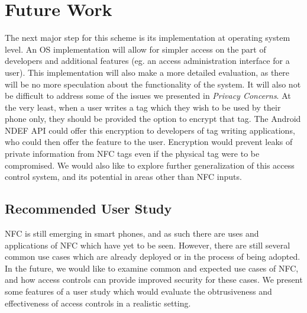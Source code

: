 \documentclass[12pt]{article}
\begin{document}
\section{Future Work}
\label{sec:futurework}
The next major step for this scheme is its implementation at operating system level.
An OS implementation will allow for simpler access on the part of developers and additional features (eg. an access administration interface for a user).
This implementation will also make a more detailed evaluation, as there will be no more speculation about the functionality of the system.
It will also not be difficult to address some of the issues we presented in \textit{Privacy Concerns}.
At the very least, when a user writes a tag which they wish to be used by their phone only, they should be provided the option to encrypt that tag.
The Android NDEF API could offer this encryption to developers of tag writing applications, who could then offer the feature to the user.
Encryption would prevent leaks of private information from NFC tags even if the physical tag were to be compromised.
We would also like to explore further generalization of this access control system, and its potential in areas other than NFC inputs.


\subsection{Recommended User Study}
NFC is still emerging in smart phones, and as such there are uses and applications of NFC which have yet to be seen.
However, there are still several common use cases which are already deployed or in the process of being adopted.
In the future, we would like to examine common and expected use cases of NFC, and how access controls can provide improved security for these cases.
We present some features of a user study which would evaluate the obtrusiveness and effectiveness of access controls in a realistic setting.
\end{document}
